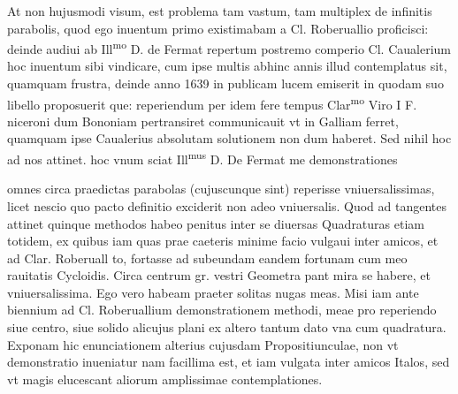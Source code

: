 \documentclass[11pt,a4paper]{article}
\begin{document}
At non hujusmodi visum, est problema tam vastum, tam multiplex de infinitis parabolis, quod ego inuentum primo existimabam a Cl. Roberuallio proficisci: deinde audiui ab Ill\textsuperscript{mo} D. de Fermat repertum postremo comperio Cl. Caualerium hoc inuentum sibi vindicare, cum ipse multis abhinc annis illud contemplatus sit, quamquam frustra, deinde anno 1639 in publicam lucem emiserit in quodam suo libello proposuerit que: reperiendum per idem fere tempus Clar\textsuperscript{mo} Viro I F. niceroni dum Bononiam pertransiret communicauit vt in Galliam ferret, quamquam ipse Caualerius absolutam solutionem non dum haberet. Sed nihil hoc ad nos attinet. hoc vnum sciat  Ill\textsuperscript{mus} D. De Fermat me demonstrationes


omnes circa praedictas parabolas (cujuscunque sint) reperisse vniuersalissimas, licet nescio quo pacto definitio exciderit non adeo vniuersalis. Quod ad tangentes attinet quinque methodos habeo penitus inter se diuersas Quadraturas etiam totidem, ex quibus iam  quas prae caeteris minime facio vulgaui inter amicos, et ad Clar. Roberuall \ill{}to, fortasse ad subeundam eandem fortunam cum meo  rauitatis Cycloidis. Circa centrum gr. vestri Geometra p\ill{}ant mira se habere, et vniuersalissima. Ego vero  habeam praeter solitas nugas meas. Misi iam ante biennium ad Cl. Roberuallium demonstrationem methodi, meae pro reperiendo siue centro, siue solido alicujus plani ex altero tantum dato vna cum quadratura. Exponam hic enunciationem alterius cujusdam Propositiunculae, non vt demonstratio inueniatur nam facillima est, et iam vulgata inter amicos Italos, sed vt magis elucescant aliorum amplissimae contemplationes.
\end{document}
